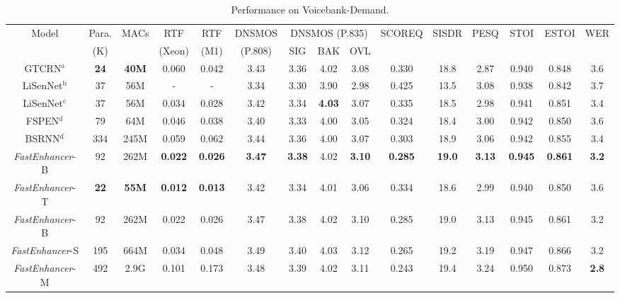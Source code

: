 \begin{table}[t]
    \caption{Performance on Voicebank-Demand.}
    \label{table:performance}
    \setlength{\tabcolsep}{3.9pt}
    \centering
    \begin{tabular}{c|c|c|c|c|c|c|c|c|c|c|c|c|c|c}
        \hline
        \multirow{2}{*}{Model} & Para. & \multirow{2}{*}{MACs} & RTF & RTF & DNSMOS & \multicolumn{3}{|c|}{DNSMOS (P.835)} & \multirow{2}{*}{SCOREQ} & \multirow{2}{*}{SISDR} & \multirow{2}{*}{PESQ} & \multirow{2}{*}{STOI} & \multirow{2}{*}{ESTOI} & \multirow{2}{*}{WER} \\
        \cline{7-9}
        & (K) & & (Xeon) & (M1) & (P.808) & SIG & BAK & OVL & & & & & & \\
        \hline
        GTCRN$^{\mathrm{a}}$\cite{gtcrn} & \textbf{24} & \textbf{40M} & 0.060 & 0.042 & 3.43 & 3.36 & 4.02 & 3.08 & 0.330 & 18.8 & 2.87 & 0.940 & 0.848 & 3.6 \\
        LiSenNet$^{\mathrm{b}}$\cite{lisennet} & 37 & 56M & - & - & 3.34 & 3.30 & 3.90 & 2.98 & 0.425 & 13.5 & 3.08 & 0.938 & 0.842 & 3.7 \\
        LiSenNet$^{\mathrm{c}}$\cite{lisennet} & 37 & 56M & 0.034 & 0.028 & 3.42 & 3.34 & \textbf{4.03} & 3.07 & 0.335 & 18.5 & 2.98 & 0.941 & 0.851 & 3.4 \\
        FSPEN$^{\mathrm{d}}$\cite{fspen} & 79 & 64M & 0.046 & 0.038 & 3.40 & 3.33 & 4.00 & 3.05 & 0.324 & 18.4 & 3.00 & 0.942 & 0.850 & 3.6 \\
        BSRNN$^{\mathrm{d}}$\cite{bsrnn-se} & 334 & 245M & 0.059 & 0.062 & 3.44 & 3.36 & 4.00 & 3.07 & 0.303 & 18.9 & 3.06 & 0.942 &  0.855 & 3.4 \\
        \textit{FastEnhancer}-B & 92 & 262M & \textbf{0.022} & \textbf{0.026} & \textbf{3.47} & \textbf{3.38} & 4.02 & \textbf{3.10} & \textbf{0.285} & \textbf{19.0} & \textbf{3.13} & \textbf{0.945} & \textbf{0.861} & \textbf{3.2} \\
        \hline
        \textit{FastEnhancer}-T & \textbf{22} & \textbf{55M} & \textbf{0.012} & \textbf{0.013} & 3.42 & 3.34 & 4.01 & 3.06 & 0.334 & 18.6 & 2.99 & 0.940 & 0.850 & 3.6 \\
        \textit{FastEnhancer}-B & 92 & 262M & 0.022 & 0.026 & 3.47 & 3.38 & 4.02 & 3.10 & 0.285 & 19.0 & 3.13 & 0.945 & 0.861 & 3.2 \\
        \textit{FastEnhancer}-S & 195 & 664M & 0.034 & 0.048 & 3.49 & 3.40 & 4.03 & 3.12 & 0.265 & 19.2 & 3.19 & 0.947 & 0.866 & 3.2 \\
        \textit{FastEnhancer}-M & 492 & 2.9G & 0.101 & 0.173 & 3.48 & 3.39 & 4.02 & 3.11 & 0.243 & 19.4 & 3.24 & 0.950 & 0.873 & \textbf{2.8} \\

\end{tabular}
\end{table}
